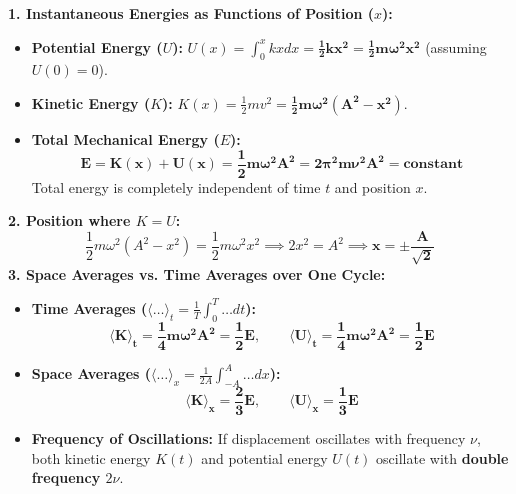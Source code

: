 \documentclass[10pt,a4paper]{article}
\begin{document}
\begin{formulabox}
\textbf{1. Instantaneous Energies as Functions of Position ($x$):}
\begin{itemize}
  \item \textbf{Potential Energy ($U$):} $U(x) = \int_0^x kx dx = \mathbf{\frac{1}{2} k x^2 = \frac{1}{2} m \omega^2 x^2}$ (assuming $U(0) = 0$).
  \item \textbf{Kinetic Energy ($K$):} $K(x) = \frac{1}{2} m v^2 = \mathbf{\frac{1}{2} m \omega^2 (A^2 - x^2)}$.
  \item \textbf{Total Mechanical Energy ($E$):}
  \begin{equation}
    \mathbf{E = K(x) + U(x) = \frac{1}{2} m \omega^2 A^2 = 2 \pi^2 m \nu^2 A^2 = \text{constant}}
  \end{equation}
  Total energy is completely independent of time $t$ and position $x$.
\end{itemize}
\textbf{2. Position where $K = U$:}
\begin{equation}
  \frac{1}{2}m\omega^2(A^2 - x^2) = \frac{1}{2}m\omega^2 x^2 \implies 2x^2 = A^2 \implies \mathbf{x = \pm \frac{A}{\sqrt{2}}}
\end{equation}
\textbf{3. Space Averages vs. Time Averages over One Cycle:}
\begin{itemize}
  \item \textbf{Time Averages ($\langle \dots \rangle_t = \frac{1}{T}\int_0^T \dots dt$):}
  \begin{equation}
    \mathbf{\langle K \rangle_t = \frac{1}{4} m \omega^2 A^2 = \frac{1}{2}E}, \qquad \mathbf{\langle U \rangle_t = \frac{1}{4} m \omega^2 A^2 = \frac{1}{2}E}
  \end{equation}
  \item \textbf{Space Averages ($\langle \dots \rangle_x = \frac{1}{2A}\int_{-A}^A \dots dx$):}
  \begin{equation}
    \mathbf{\langle K \rangle_x = \frac{2}{3}E}, \qquad \mathbf{\langle U \rangle_x = \frac{1}{3}E}
  \end{equation}
  \item \textbf{Frequency of Oscillations:} If displacement oscillates with frequency $\nu$, both kinetic energy $K(t)$ and potential energy $U(t)$ oscillate with \textbf{double frequency $2\nu$}.
\end{itemize}
\end{formulabox}
\end{document}
